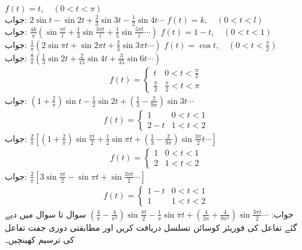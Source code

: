 \quad 
$f(t)=t,\quad (0<t<\pi)$\\
جواب:\quad
$2\sin t-\sin 2t+\tfrac{2}{3}\sin 3t-\tfrac{1}{2}\sin 4t\cdots$
\quad 
$f(t)=k,\quad (0<t<l)$\\
جواب:\quad
$\tfrac{4k}{\pi}(\sin \tfrac{\pi t}{l}+\tfrac{1}{3}\sin \tfrac{3\pi t}{l}+\tfrac{1}{5}\sin \tfrac{5\pi t}{l}\cdots)$
\quad
$f(t)=1-t,\quad (0<t<1)$\\
جواب:\quad
$\tfrac{1}{\pi}(2\sin \pi t+\sin 2\pi t+\tfrac{2}{3}\sin 3\pi t\cdots)$
\quad
$f(t)=\cos t,\quad (0<t<\frac{\pi}{2})$\\
جواب:\quad
$\tfrac{8}{\pi}(\tfrac{1}{3}\sin 2t+\tfrac{2}{15}\sin 4t+\tfrac{3}{35}\sin 6t\cdots)$
\begin{align*}
f(t)=
\begin{cases}
t&0<t<\frac{\pi}{2}\\
\frac{\pi}{2}&\frac{\pi}{2}<t<\pi
\end{cases}
\end{align*}
جواب:\quad
$(1+\tfrac{2}{\pi})\sin t-\tfrac{1}{2}\sin 2t+(\tfrac{1}{3}-\tfrac{2}{9\pi})\sin 3t\cdots$
\begin{align*}
f(t)=
\begin{cases}
1&0<t<1\\
2-t&1<t<2
\end{cases}
\end{align*}
جواب:\quad
$\tfrac{2}{\pi}[(1+\tfrac{2}{\pi})\sin \tfrac{\pi t}{2}+\tfrac{1}{2}\sin \pi t+(\tfrac{1}{3}-\tfrac{2}{9\pi})\sin \tfrac{3\pi}{2}t\cdots]$
\begin{align*}
f(t)=
\begin{cases}
1&0<t<1\\
2&1<t<2
\end{cases}
\end{align*}
جواب:\quad
$\tfrac{2}{\pi}[3\sin \tfrac{\pi t}{2}-\sin \pi t+\sin \tfrac{3\pi t}{2}\cdots]$
\begin{align*}
f(t)=
\begin{cases}
1-t&0<t<1\\
1&1<t<2
\end{cases}
\end{align*}
جواب:\quad
$(\tfrac{4}{\pi}-\tfrac{4}{\pi^2})\sin \tfrac{\pi t}{2}-\tfrac{1}{\pi} \sin \pi t+(\tfrac{4}{3\pi}+\tfrac{4}{9\pi^2})\sin\tfrac{3\pi t}{2}\cdots$
سوال  تا سوال  میں دیے گئے تفاعل  کی فوریئر کوسائن تسلسل دریافت کریں  اور مطابقتی دوری جفت تفاعل کی ترسیم کھینچیں۔


